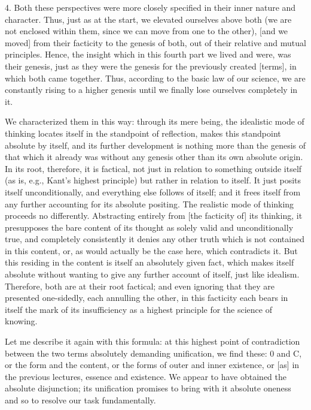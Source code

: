 4. Both these perspectives were more closely specified
in their inner nature and character.
Thus, just as at the start,
we elevated ourselves above both
(we are not enclosed within them,
since we can move from one to the other),
[and we moved] from their facticity to the genesis of both,
out of their relative and mutual principles.
Hence, the insight which in this fourth part
we lived and were, was their genesis,
just as they were the genesis
for the previously created [terms],
in which both came together.
Thus, according to the basic law of our science,
we are constantly rising to a higher genesis
until we finally lose ourselves completely in it.

We characterized them in this way:
through its mere being,
the idealistic mode of thinking locates itself
in the standpoint of reflection,
makes this standpoint absolute by itself,
and its further development is nothing more than
the genesis of that which it already was
without any genesis other than its own absolute origin.
In its root, therefore, it is factical,
not just in relation to something outside itself
(as is, e.g., Kant's highest principle)
but rather in relation to itself.
It just posits itself unconditionally,
and everything else follows of itself;
and it frees itself from any further
accounting for its absolute positing.
The realistic mode of thinking proceeds no differently.
Abstracting entirely from [the facticity of] its thinking,
it presupposes the bare content of its thought
as solely valid and unconditionally true,
and completely consistently it denies any other
truth which is not contained in this content,
or, as would actually be the case here,
which contradicts it.
But this residing in the content is
itself an absolutely given fact,
which makes itself absolute
without wanting to give any further account of itself,
just like idealism.
Therefore, both are at their root factical;
and even ignoring that they are presented one-sidedly,
each annulling the other,
in this facticity each bears in itself
the mark of its insufficiency as
a highest principle for the science of knowing.

Let me describe it again with this formula:
at this highest point of contradiction
between the two terms absolutely demanding unification,
we find these: 0 and C,
or the form and the content,
or the forms of outer and inner existence,
or [as] in the previous lectures, essence and existence.
We appear to have obtained the absolute disjunction;
its unification promises to bring with it absolute oneness
and so to resolve our task fundamentally.

